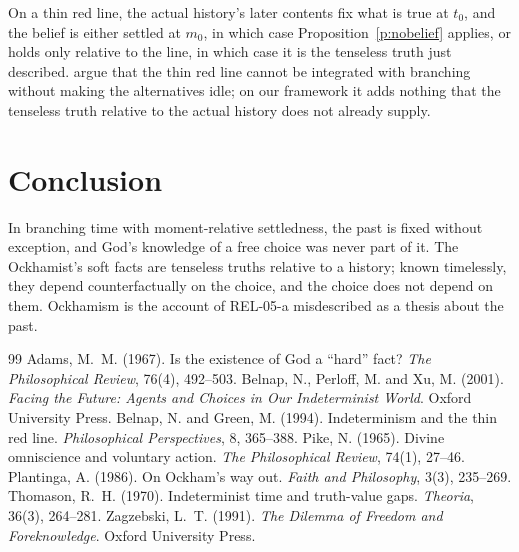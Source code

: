 \documentclass{situationist-preprint}
\begin{document}
\begin{reply}
On a thin red line, the actual history's later contents fix what is true at $t_0$, and the belief is either settled at $m_0$, in which case Proposition~\ref{p:nobelief} applies, or holds only relative to the line, in which case it is the tenseless truth just described. \citet{BelnapGreen1994} argue that the thin red line cannot be integrated with branching without making the alternatives idle; on our framework it adds nothing that the tenseless truth relative to the actual history does not already supply.
\end{reply}

\section{Conclusion}

In branching time with moment-relative settledness, the past is fixed without exception, and God's knowledge of a free choice was never part of it. The Ockhamist's soft facts are tenseless truths relative to a history; known timelessly, they depend counterfactually on the choice, and the choice does not depend on them. Ockhamism is the account of REL-05-a misdescribed as a thesis about the past.

\begin{thebibliography}{99}\small
{} Adams, M.~M. (1967). Is the existence of God a \enquote{hard} fact? \emph{The Philosophical Review}, 76(4), 492--503.
 Belnap, N., Perloff, M. and Xu, M. (2001). \emph{Facing the Future: Agents and Choices in Our Indeterminist World}. Oxford University Press.
 Belnap, N. and Green, M. (1994). Indeterminism and the thin red line. \emph{Philosophical Perspectives}, 8, 365--388.
 Pike, N. (1965). Divine omniscience and voluntary action. \emph{The Philosophical Review}, 74(1), 27--46.
 Plantinga, A. (1986). On Ockham's way out. \emph{Faith and Philosophy}, 3(3), 235--269.
 Thomason, R.~H. (1970). Indeterminist time and truth-value gaps. \emph{Theoria}, 36(3), 264--281.
 Zagzebski, L.~T. (1991). \emph{The Dilemma of Freedom and Foreknowledge}. Oxford University Press.
\end{thebibliography}
\end{document}

